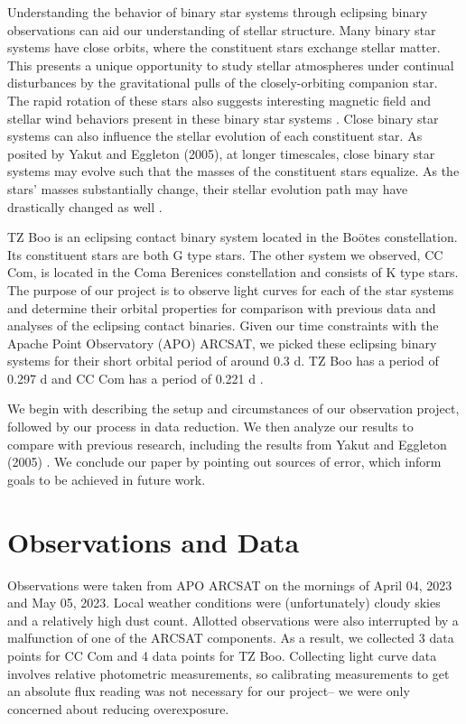 \documentclass[12pt]{article}
\begin{document}
Understanding the behavior of binary star systems through eclipsing binary observations can aid our understanding of stellar structure. Many binary star systems have close orbits, where the constituent stars exchange stellar matter. This presents a unique opportunity to study stellar atmospheres under continual disturbances by the gravitational pulls of the closely-orbiting companion star. The rapid rotation of these stars also suggests interesting magnetic field and stellar wind behaviors present in these binary star systems \cite{2001icbs.book.....H}. Close binary star systems can also influence the stellar evolution of each constituent star. As posited by Yakut and Eggleton (2005), at longer timescales, close binary star systems may evolve such that the masses of the constituent stars equalize. As the stars’ masses substantially change, their stellar evolution path may have drastically changed as well \cite{2005ApJ...629.1055Y}.

TZ Boo is an eclipsing contact binary system located in the Boötes constellation. Its constituent stars are both G type stars. The other system we observed, CC Com, is located in the Coma Berenices constellation and consists of K type stars. The purpose of our project is to observe light curves for each of the star systems and determine their orbital properties for comparison with previous data and analyses of the eclipsing contact binaries. Given our time constraints with the Apache Point Observatory (APO) ARCSAT, we picked these eclipsing binary systems for their short orbital period of around 0.3 d. TZ Boo has a period of 0.297 d and CC Com has a period of 0.221 d \cite{2005ApJ...629.1055Y}. 

    We begin with describing the setup and circumstances of our observation project, followed by our process in data reduction. We then analyze our results to compare with previous research, including the results from Yakut and Eggleton (2005) \cite{2005ApJ...629.1055Y}. We conclude our paper by pointing out sources of error, which inform goals to be achieved in future work.

\section{Observations and Data}

Observations were taken from APO ARCSAT on the mornings of April 04, 2023 and May 05, 2023. Local weather conditions were (unfortunately) cloudy skies and a relatively high dust count. Allotted observations were also interrupted by a malfunction of one of the ARCSAT components. As a result, we collected 3 data points for CC Com and 4 data points for TZ Boo. Collecting light curve data involves relative photometric measurements, so calibrating measurements to get an absolute flux reading was not necessary for our project– we were only concerned about reducing overexposure. 
\end{document}
